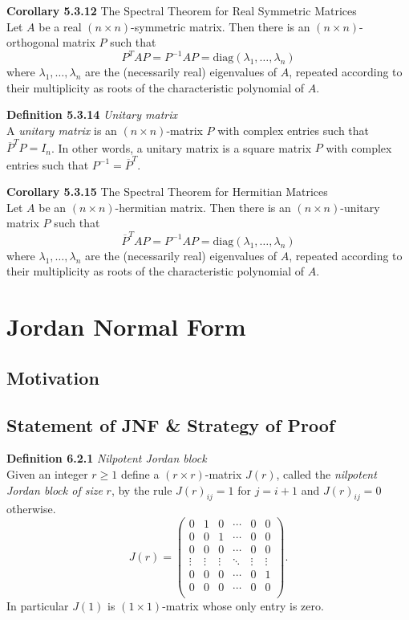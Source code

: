 \documentclass[8pt,landscape]{article}
\begin{document}
\begin{multicols}{3}
    \textbf{Corollary 5.3.12} The Spectral Theorem for Real Symmetric Matrices \\
    Let $A$ be a real $(n \times n)$-symmetric matrix.
    Then there is an $(n \times n)$-orthogonal matrix $P$ such that
    \[
        P^T AP = P^{-1} AP = \mathrm{diag}(\lambda_1, \ldots, \lambda_n)
    \]
    where $\lambda_1, \ldots, \lambda_n$ are the (necessarily real) eigenvalues of $A$,
    repeated according to their multiplicity as roots of the characteristic polynomial of
    $A$.

    \textbf{Definition 5.3.14} \emph{Unitary matrix} \\
    A \emph{unitary matrix} is an $(n \times n)$-matrix $P$ with complex entries such that
    $\overline{P}^T P = I_n$.
    In other words, a unitary matrix is a square matrix $P$ with complex entries such that
    $P^{-1} = \overline{P}^T$.

    \textbf{Corollary 5.3.15} The Spectral Theorem for Hermitian Matrices \\
    Let $A$ be an $(n \times n)$-hermitian matrix.
    Then there is an $(n \times n)$-unitary matrix $P$ such that
    \[
        \overline{P}^T AP = P^{-1} AP = \mathrm{diag}(\lambda_1, \ldots, \lambda_n)
    \]
    where $\lambda_1, \ldots, \lambda_n$ are the (necessarily real) eigenvalues of $A$,
    repeated according to their multiplicity as roots of the characteristic polynomial of
    $A$.

    \section{Jordan Normal Form}

    \subsection{Motivation}

    \subsection{Statement of JNF \& Strategy of Proof}

    \textbf{Definition 6.2.1} \emph{Nilpotent Jordan block} \\
    Given an integer $r \geq 1$ define a $(r \times r)$-matrix $J(r)$,
    called the \emph{nilpotent Jordan block of size} $r$,
    by the rule $J{(r)}_{ij} = 1$ for $j = i+1$ and $J{(r)}_{ij} = 0$ otherwise.
    \[
        J(r) =
        \begin{pmatrix}
            0 & 1 & 0 & \cdots & 0 & 0 \\
            0 & 0 & 1 & \cdots & 0 & 0 \\
            0 & 0 & 0 & \cdots & 0 & 0 \\
            \vdots & \vdots & \vdots & \ddots & \vdots & \vdots \\
            0 & 0 & 0 & \cdots & 0 & 1 \\
            0 & 0 & 0 & \cdots & 0 & 0 \\
        \end{pmatrix}.
    \]
    In particular $J(1)$ is $(1 \times 1)$-matrix whose only entry is zero.


\end{multicols}
\end{document}
